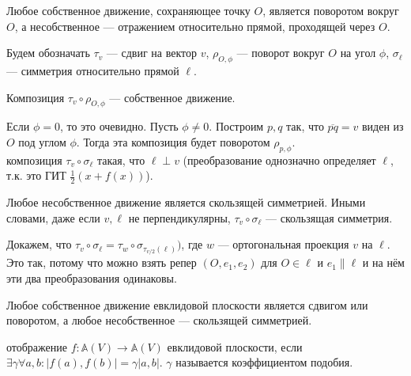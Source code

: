 \documentclass[12pt,a4paper]{article}
\begin{document}
\lemma Любое собственное движение, сохраняющее точку $O$, является поворотом вокруг $O$, а несобственное --- отражением относительно прямой, проходящей через $O$.

Будем обозначать $\tau_v$ --- сдвиг на вектор $v$, $\rho_{O,\phi}$ --- поворот вокруг $O$ на угол $\phi$, $\sigma_\ell$ --- симметрия относительно прямой $\ell$.

\lemma Композиция $\tau_v\circ \rho_{O,\phi}$ --- собственное движение.

\proof Если $\phi=0$, то это очевидно. Пусть $\phi\neq 0$. Построим $p,q$ так, что $\overline{pq}=v$ виден из $O$ под углом $\phi$. Тогда эта композиция будет поворотом $\rho_{p,\phi}$.\QEDA\\

 композиция $\tau_v\circ \sigma_\ell$ такая, что $\ell\perp v$ (преобразование однозначно определяет $\ell$, т.к. это ГИТ $\frac{1}{2}(x+f(x))$).

\lemma Любое несобственное движение является скользящей симметрией. Иными словами, даже если $v,\ell$ не перпендикулярны, $\tau_v\circ \sigma_\ell$ --- скользящая симметрия.

\proof Докажем, что $\tau_v\circ \sigma_\ell = \tau_w\circ\sigma_{\tau_{v /2}(\ell)})$, где $w$ --- ортогональная проекция $v$ на $\ell$. Это так, потому что можно взять репер $(O,e_1,e_2)$ для $O\in\ell$ и $e_1\parallel \ell$ и на нём эти два преобразования одинаковы.\QEDA

 Любое собственное движение евклидовой плоскости является сдвигом или поворотом, а любое несобственное --- скользящей симметрией. 

 отображение $f:\mathbb A (V)\to \mathbb A (V)$ евклидовой плоскости, если $\exists \gamma\forall a,b:|f(a),f(b)|=\gamma|a,b|$. $\gamma$ называется коэффициентом подобия.\\
\end{document}
